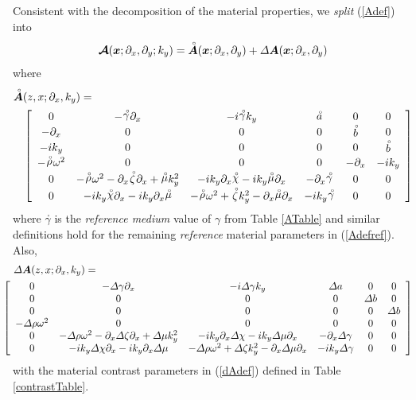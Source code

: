 \documentclass[11pt]{article}
\newcommand{\CB}[1]{\mbox{\boldmath$\cal #1$\unboldmath}}
\newcommand{\bmi}[1]{\mbox{\boldmath$\mit #1$\unboldmath}}
\newcommand{\rf}[1]{\stackrel{\scriptscriptstyle _{\,\,\circ}}{ #1}}
\begin{document}
Consistent with the decomposition of the material properties, we
 {\em split\/} (\ref{Adef}) into
\begin{equation} \label{Asplit}
{\CB A}({\bmi x};{\partial }_{x},{\partial }_{y};k_y)=
{\rf{\bmi A}}({\bmi x};{\partial }_{x},{\partial }_{y})
+{{\mit \Delta} {\bmi A}}({\bmi x};{\partial }_{x},{\partial }_{y})
\end{equation}
where
\begin{eqnarray} \label{Adefref}
\lefteqn{
{\rf{\bmi A}}(z,x;{\partial }_{x},{k}_{y})
=}\nonumber\\
&&\left[{\begin{array}{cccccc}
0&- {\rf \gamma} {\partial }_{  x}&  -i {\rf \gamma} {  k}_{  y}&  {\rf a}&0&0\\ -{ \partial
}_{x}&0&0&0&{\rf b}&0\\ -i{k}_{y}&0&0&0&0&{\rf b}\\ - {\rf \rho} {\omega }^{
2}&  0&0&0&-{ \partial }_{x}&-i{k}_{y}\\ 0&- {\rf \rho} {\omega
}^{  2}  -{ \partial }_{x} {\rf \zeta} {\partial }_{
x}  + {\rf \mu} {  k}_{  y}^{  2}&
-i{k}_{y}{ \partial }_{x} {\rf \chi}   -i{k}_{y} {\rf \mu} {\partial
}_{  x}&  -{ \partial }_{x} {\rf \gamma} &  0&0\\
0&-i{k}_{y} {\rf \chi} {\partial }_{  x}  -i{k}_{y}{ \partial
}_{x} {\rf \mu} &  - {\rf \rho} {\omega }^{  2}  + {\rf \zeta }
{  k}_{  y}^{  2}  -{ \partial }_{x} {\rf \mu}
{\partial }_{  x}&  -i{k}_{y} {\rf \gamma} &
0&0\end{array}}\right]
\end{eqnarray}
where ${\rf \gamma}$ is the {\em reference medium\/} value of ${\gamma}$
from Table \ref{ATable} and similar definitions hold for the remaining
{\em reference\/} material parameters
in (\ref{Adefref}). Also,
\begin{eqnarray} \label{dAdef}
\lefteqn{
{{\mit \Delta} {\bmi A}}(z,x;{\partial }_{x},{k}_{y})
=}\\
&&\!\!\!\!\!\!\!\!\!\!\!\!
\left[{\begin{array}{cccccc}
0&- {{\mit \Delta} \gamma} {\partial }_{  x}&  -i {{\mit \Delta} \gamma} {  k}_{  y}&
{{\mit \Delta} a}&0&0\\0&0&0&0&{{\mit \Delta} b}&0\\ 0&0&0&0&0&{{\mit \Delta} b}\\ - {{\mit \Delta} \rho} {\omega }^{
2}&  0&0&0&0&0\\ 0&- {{\mit \Delta} \rho} {\omega
}^{  2}  -{ \partial }_{x} {{\mit \Delta} \zeta} {\partial }_{
x}  + {{\mit \Delta} \mu} {  k}_{  y}^{  2}&
-i{k}_{y}{ \partial }_{x} {{\mit \Delta} \chi}   -i{k}_{y} {{\mit \Delta} \mu} {\partial
}_{  x}&  -{ \partial }_{x} {{\mit \Delta} \gamma} &  0&0\\
0&-i{k}_{y} {{\mit \Delta} \chi} {\partial }_{  x}  -i{k}_{y}{ \partial
}_{x} {{\mit \Delta} \mu} &  - {{\mit \Delta} \rho} {\omega }^{  2}  + {{\mit \Delta} \zeta }
{  k}_{  y}^{  2}  -{ \partial }_{x} {{\mit \Delta} \mu}
{\partial }_{  x}&  -i{k}_{y} {{\mit \Delta} \gamma} &  0&0\end{array}}\right]\nonumber
\end{eqnarray}
with the material contrast parameters in (\ref{dAdef}) defined in Table \ref{contrastTable}.
\end{document}
